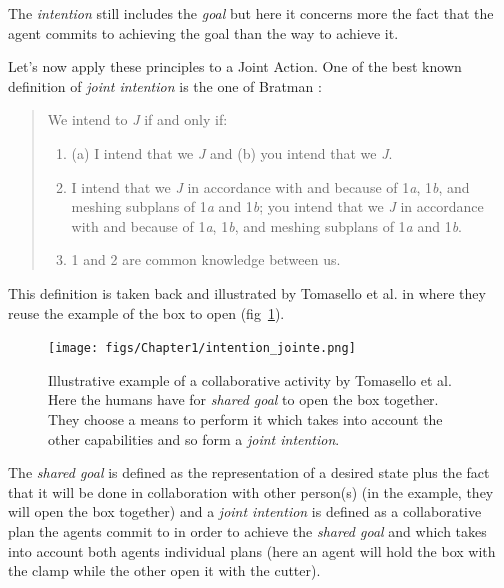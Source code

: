 \documentclass[english,a4paper,11pt,twoside]{StyleThese}
\begin{document}
The \textit{intention} still includes the \textit{goal} but here it concerns more the fact that the agent commits to achieving the goal than the way to achieve it.

Let's now apply these principles to a Joint Action. One of the best known definition of \textit{joint intention} is the one of Bratman \cite{bratman1993shared}:
\begin{quote}
We intend to \textit{J} if and only if:
\begin{enumerate}
\item (a) I intend that we \textit{J} and (b) you intend that we \textit{J}.
\item I intend that we \textit{J} in accordance with and because of 1\textit{a}, 1\textit{b}, and meshing subplans of 1\textit{a} and 1\textit{b}; you intend that we \textit{J} in accordance with and because of 1\textit{a}, 1\textit{b}, and meshing subplans of 1\textit{a} and 1\textit{b}.
\item 1 and 2 are common knowledge between us.
\end{enumerate}
\end{quote}

This definition is taken back and illustrated by Tomasello et al. in \cite{tomasello2005understanding} where they reuse the example of the box to open (fig~\ref{fig:intention_jointe}).

\begin{figure}[!h]
	\centering
    \texttt{[image: figs/Chapter1/intention\_jointe.png]}
    \caption{Illustrative example of a collaborative activity by Tomasello et al. Here the humans have for \textit{shared goal} to open the box together. They choose a means to perform it which takes into account the other capabilities and so form a \textit{joint intention}.}
    \label{fig:intention_jointe}
\end{figure}

The \textit{shared goal} is defined as the representation of a desired state plus the fact that it will be done in collaboration with other person(s) (in the example, they will open the box together) and a \textit{joint intention} is defined as a collaborative plan the agents commit to in order to achieve the \textit{shared goal} and which takes into account both agents individual plans (here an agent will hold the box with the clamp while the other open it with the cutter).
\end{document}
